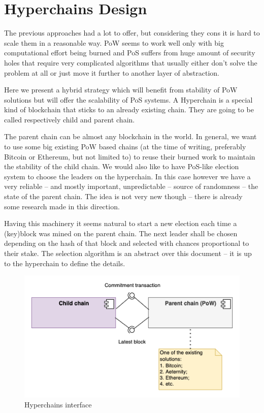 \section{Hyperchains Design}
\graphicspath{ {./images/} }

The previous approaches had a lot to offer, but considering they cons it is hard
to scale them in a reasonable way. PoW seems to work well only with big
computational effort being burned and PoS suffers from huge amount of security
holes that require very complicated algorithms that usually either don't solve
the problem at all or just move it further to another layer of abstraction.

Here we present a hybrid strategy which will benefit from stability of PoW
solutions but will offer the scalability of PoS systems. A Hyperchain is a
special kind of blockchain that sticks to an already existing chain. They are
going to be called respectively child and parent chain\cite{hyperchains}.

The parent chain can be almost any blockchain in the world. In general, we want
to use some big existing PoW based chains (at the time of writing, preferably
Bitcoin or Ethereum, but not limited to) to reuse their burned work to maintain
the stability of the child chain. We would also like to have
PoS-like election system to choose the leaders on the hyperchain. In this case
however we have a very reliable – and mostly important, unpredictable – source
of randomness – the state of the parent chain. The idea is not very new
though – there is already some research made in this direction\cite{blockchain_random}.

Having this machinery it seems natural to start a new election each time a
(key)block was mined on the parent chain. The next leader shall be chosen
depending on the hash of that block and selected with chances proportional to
their stake. The selection algorithm is an abstract over this document – it is
up to the hyperchain to define the details.

\begin{figure}[b]
     \caption{Hyperchains interface}
     \centering
     \includegraphics[scale=0.5]{hyperchains_interface}
\end{figure}

